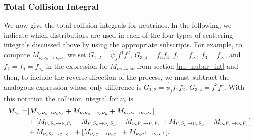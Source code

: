 \subsubsection{Total Collision Integral}
We now give the total collision integrals for neutrinos.    In the following, we indicate which distributions are used in each of the four types of scattering integrals discussed above by using the appropriate subscripts. For example, to compute $M_{\nu_e\bar\nu_\mu\rightarrow\nu_e\bar\nu_\mu}$  we set $G_{1,2}=\hat\psi_jf^1f^2$, $G_{3,4}=f_3f_4$, $f_1= f_{\nu_e}$, $f_3=f_{\nu_e}$, and $f_2=f_4=f_{\bar\nu_\mu}$ in the expression for $M_{\nu\bar\nu\rightarrow\nu\bar\nu}$ from section \ref{nu_nubar_int} and then, to include the reverse direction of the process, we must {\emph subtract}  the analogous expression whose only difference is $G_{1,2}=\hat\psi_jf_1f_2$, $G_{3,4}=f^3f^4$.
With this notation the collision integral for $\nu_e$ is
\begin{align}\label{M_tot}
M_{\nu_e}=&[M_{\nu_e\nu_e\rightarrow\nu_e\nu_e}+M_{\nu_e\nu_\mu\rightarrow\nu_e\nu_\mu}+M_{\nu_e\nu_\tau\rightarrow\nu_e\nu_\tau}]\\
&+[M_{\nu_e\bar\nu_e\rightarrow\nu_e\bar\nu_e}+M_{\nu_e\bar\nu_e\rightarrow\nu_\mu\bar\nu_\mu}+M_{\nu_e\bar\nu_e\rightarrow\nu_\tau\bar\nu_\tau}+M_{\nu_e\bar\nu_\mu\rightarrow\nu_e\bar\nu_\mu}+M_{\nu_e\bar\nu_\tau\rightarrow\nu_e\bar\nu_\tau}]\notag\\
&+M_{\nu_e\bar\nu_e\rightarrow e^+e^-}+[M_{\nu_e e^-\rightarrow\nu_e e^-}+M_{\nu_e e^+\rightarrow\nu_e e^+}].
\end{align}


